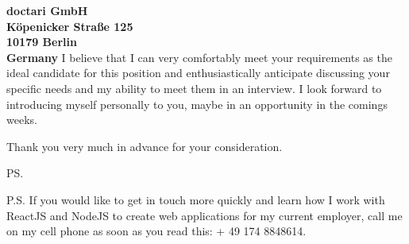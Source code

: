 \documentclass[a4paper]{joaosoares-letter}
\begin{document}
\begin{letter}{\bfseries doctari GmbH\\Köpenicker Straße 125\\10179 Berlin\\Germany}
I believe that I can very comfortably meet your requirements as the ideal candidate for this position and enthusiastically anticipate discussing your specific needs and my ability to meet them in an interview. I look forward to introducing myself personally to you, maybe in an opportunity in the comings weeks.

\closing{ Thank you very much in advance for your consideration.}
\vspace{20pt}
\ps

P.S. If you would like to get in touch more quickly and learn how I work with ReactJS and NodeJS to create web applications for my current employer, call me on my cell phone as soon as you read this: + 49 174 8848614.
\vspace{\fill}

\end{letter}
\end{document}
